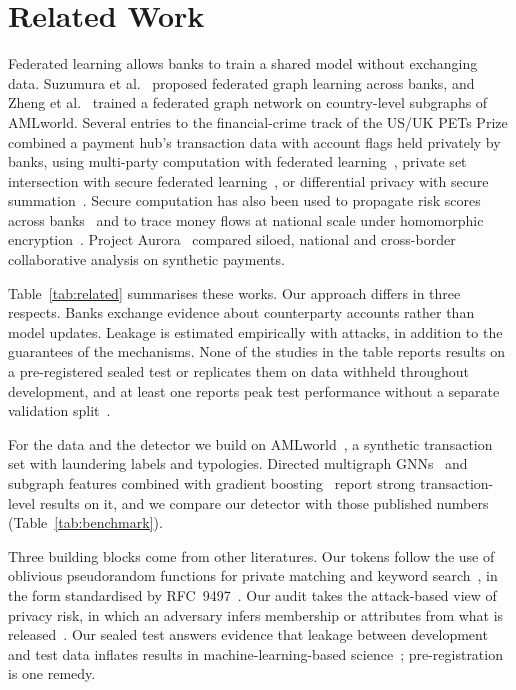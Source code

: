 \documentclass[conference]{IEEEtran}
\begin{document}
\section{Related Work}\label{sec:related}

Federated learning allows banks to train a shared model without exchanging data.
Suzumura et al.~\cite{suzumura2019} proposed federated graph learning across banks, and
Zheng et al.~\cite{zheng2025} trained a federated graph network on country-level subgraphs
of AMLworld. Several entries to the financial-crime track of the US/UK PETs Prize combined a
payment hub's transaction data with account flags held privately by banks, using
multi-party computation with federated learning~\cite{arora2023}, private set intersection
with secure federated learning~\cite{abadi2024starlit}, or differential privacy with secure
summation~\cite{khan2024fedrd}. Secure computation has also been used to propagate risk
scores across banks~\cite{vanegmond2024} and to trace money flows at national scale under
homomorphic encryption~\cite{brand2023fintracer}. Project Aurora~\cite{bis2023aurora}
compared siloed, national and cross-border collaborative analysis on synthetic payments.

Table~\ref{tab:related} summarises these works. Our approach differs in three respects.
Banks exchange evidence about counterparty accounts rather than model updates. Leakage is
estimated empirically with attacks, in addition to the guarantees of the mechanisms. None of
the studies in the table reports results on a pre-registered sealed test or replicates them
on data withheld throughout development, and at least one reports peak test performance
without a separate validation split~\cite{khan2024fedrd}.

For the data and the detector we build on AMLworld~\cite{altman2023}, a synthetic
transaction set with laundering labels and typologies. Directed multigraph
GNNs~\cite{egressy2024} and subgraph features combined with gradient
boosting~\cite{blanusa2024} report strong transaction-level results on it, and we compare
our detector with those published numbers (Table~\ref{tab:benchmark}).

Three building blocks come from other literatures. Our tokens follow the use of oblivious
pseudorandom functions for private matching and keyword search~\cite{freedman2005keyword},
in the form standardised by RFC~9497~\cite{rfc9497}. Our audit takes the attack-based view
of privacy risk, in which an adversary infers membership or attributes from what is
released~\cite{yeom2018privacy}. Our sealed test answers evidence that leakage between
development and test data inflates results in machine-learning-based
science~\cite{kapoor2023leakage}; pre-registration~\cite{nosek2018} is one remedy.
\end{document}
